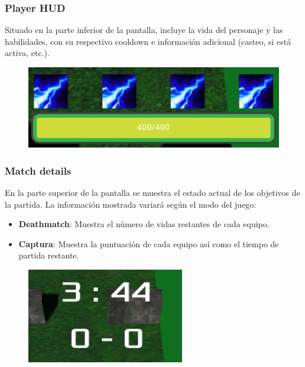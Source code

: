 \subsubsection{Player HUD}
Situado en la parte inferior de la pantalla, incluye la vida del personaje y las habilidades, con su respectivo cooldown e información adicional (casteo, si está activa, etc.).

\begin{figure}[h]
	\centering
	\includegraphics[width=0.6\linewidth]{figures/PlayerHUD}
	\label{fig:PlayerHUD}
\end{figure}

\vspace{\baselineskip}

\subsubsection{Match details}

En la parte superior de la pantalla se muestra el estado actual de los objetivos de la partida. La información mostrada variará según el modo del juego:

\begin{itemize}
	\item \textbf{Deathmatch}: Muestra el número de vidas restantes de cada equipo.
	\item \textbf{Captura}: Muestra la puntuación de cada equipo así como el tiempo de partida restante.
\end{itemize}

\begin{figure}[h]
	\centering
	\includegraphics[width=0.6\linewidth]{figures/MatchDetails}
	\label{fig:MatchDetails}
\end{figure}

